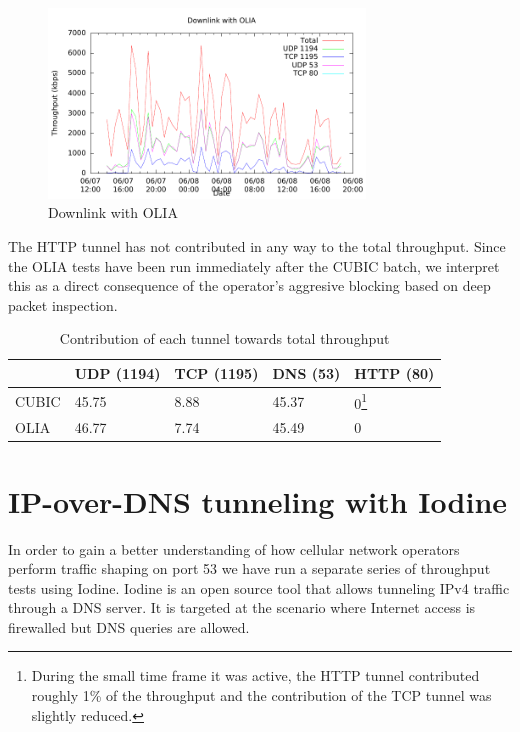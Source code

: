 \begin{figure}[H]
  \centering
  \includegraphics[width=0.75\textwidth]{img/down-olia}
  \caption{Downlink with OLIA}
  \label{fig:down-olia}
\end{figure}

The HTTP tunnel has not contributed in any way to the total throughput. Since
the OLIA tests have been run immediately after the CUBIC batch, we interpret
this as a direct consequence of the operator's aggresive blocking based on
deep packet inspection.
\begin{savenotes}
\begin{center}
	\begin{table}[htb]
	\centering
	\begin{tabular}{ | l | l | l | l | l | }
	\hline
	& UDP (1194) & TCP (1195) & DNS (53) & HTTP (80) \\ \hline
	CUBIC & 45.75 & 8.88 &  45.37 & 0\footnote{During the small time frame it was active, the HTTP tunnel contributed roughly 1\% of the throughput and the contribution of the TCP tunnel was slightly reduced.} \\ \hline
	OLIA & 46.77 & 7.74 & 45.49 & 0 \\ \hline
	\end{tabular}
	\caption{Contribution of each tunnel towards total throughput}
	\label{table:iodine}
	\end{table}
\end{center}
\end{savenotes}

\section{IP-over-DNS tunneling with Iodine}

In order to gain a better understanding of how cellular network operators
perform traffic shaping on port 53 we have run a separate series of throughput
tests using Iodine. Iodine is an open source tool that allows tunneling IPv4
traffic through a DNS server. It is targeted at the scenario where Internet access is firewalled but DNS queries are allowed.

